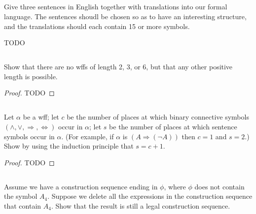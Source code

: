 \documentclass{report}
\begin{document}
\subsection{}%

  Give three sentences in English together with translations into our formal
    language.
  The sentences shoudl be chosen so as to have an interesting structure, and the
    translations should each contain 15 or more symbols.

  \begin{answer}
    TODO
  \end{answer}

\subsection{}%

  Show that there are no wffs of length 2, 3, or 6, but that any other positive
    length is possible.

  \begin{proof}
    TODO
  \end{proof}

\subsection{}%

  Let $\alpha$ be a wff; let $c$ be the number of places at which binary
    connective symbols $(\land, \lor, \Rightarrow, \Leftrightarrow)$ occur in
    $\alpha$; let $s$ be the number of places at which sentence symbols occur in
    $\alpha$.
  (For example, if $\alpha$ is $(A \Rightarrow (\neg A))$ then $c = 1$ and
    $s = 2$.)
  Show by using the induction principle that $s = c + 1$.

  \begin{proof}
    TODO
  \end{proof}

\subsection{}%

  Assume we have a construction sequence ending in $\phi$, where $\phi$ does not
    contain the symbol $A_4$.
  Suppose we delete all the expressions in the construction sequence that
    contain $A_4$.
  Show that the result is still a legal construction sequence.
\end{document}
